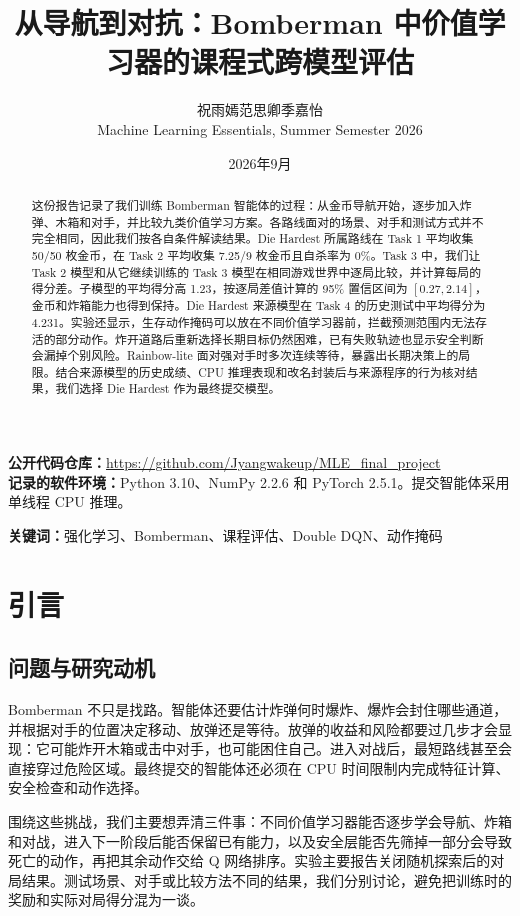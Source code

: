 \documentclass[UTF8,11pt,a4paper,fontset=none]{ctexart}
\title{从导航到对抗：Bomberman 中价值学习器的课程式跨模型评估}
\author{祝雨嫣\quad 范思卿\quad 季嘉怡\\\small Machine Learning Essentials, Summer Semester 2026}
\date{2026年9月}
\begin{document}
\maketitle
\begin{center}
\textbf{公开代码仓库：}\url{https://github.com/Jyangwakeup/MLE_final_project}\\
\textbf{记录的软件环境：}Python 3.10、NumPy 2.2.6 和 PyTorch 2.5.1。提交智能体采用单线程 CPU 推理。
\end{center}

\begin{abstract}
这份报告记录了我们训练 Bomberman 智能体的过程：从金币导航开始，逐步加入炸弹、木箱和对手，并比较九类价值学习方案。各路线面对的场景、对手和测试方式并不完全相同，因此我们按各自条件解读结果。Die Hardest 所属路线在 Task 1 平均收集 50/50 枚金币，在 Task 2 平均收集 7.25/9 枚金币且自杀率为 0\%。Task 3 中，我们让 Task 2 模型和从它继续训练的 Task 3 模型在相同游戏世界中逐局比较，并计算每局的得分差。子模型的平均得分高 1.23，按逐局差值计算的 95\% 置信区间为 $[0.27,2.14]$，金币和炸箱能力也得到保持。Die Hardest 来源模型在 Task 4 的历史测试中平均得分为 4.231。实验还显示，生存动作掩码可以放在不同价值学习器前，拦截预测范围内无法存活的部分动作。炸开道路后重新选择长期目标仍然困难，已有失败轨迹也显示安全判断会漏掉个别风险。Rainbow-lite 面对强对手时多次连续等待，暴露出长期决策上的局限。结合来源模型的历史成绩、CPU 推理表现和改名封装后与来源程序的行为核对结果，我们选择 Die Hardest 作为最终提交模型。
\end{abstract}
\noindent\textbf{关键词：}强化学习、Bomberman、课程评估、Double DQN、动作掩码

\tableofcontents
\clearpage

\section{引言}
\subsection{问题与研究动机}
Bomberman 不只是找路。智能体还要估计炸弹何时爆炸、爆炸会封住哪些通道，并根据对手的位置决定移动、放弹还是等待。放弹的收益和风险都要过几步才会显现：它可能炸开木箱或击中对手，也可能困住自己。进入对战后，最短路线甚至会直接穿过危险区域。最终提交的智能体还必须在 CPU 时间限制内完成特征计算、安全检查和动作选择。

围绕这些挑战，我们主要想弄清三件事：不同价值学习器能否逐步学会导航、炸箱和对战，进入下一阶段后能否保留已有能力，以及安全层能否先筛掉一部分会导致死亡的动作，再把其余动作交给 Q 网络排序。实验主要报告关闭随机探索后的对局结果。测试场景、对手或比较方法不同的结果，我们分别讨论，避免把训练时的奖励和实际对局得分混为一谈。
\end{document}
